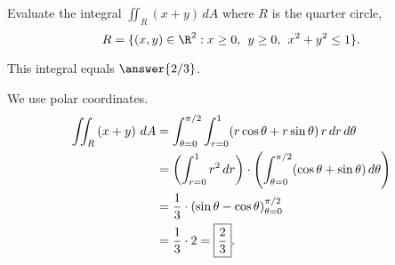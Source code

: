 \documentclass{ximera}
\author{Jim Fowler}
\begin{document}
\begin{exercise}
  Evaluate the integral $\displaystyle\iint_R \left(x + y\right) \, dA$ where $R$ is the quarter circle,
$$
R = \{ (x,y) \in \R^2 : x \geq 0,\hspace{1ex} y \geq 0,\hspace{1ex} x^2 + y^2 \leq 1 \}.
$$

This integral equals $\answer{2/3}$.

\begin{hint}
 We use polar coordinates.
 \begin{align*}
 \iint_R \left(x + y\right) \, dA
 &= \int_{\theta=0}^{\pi/2} \int_{r=0}^{1} (r \cos \theta + r \sin \theta) \, r \, dr \, d\theta \\  
 &= \left( \int_{r=0}^{1} r^2 \, dr \right) \cdot \left( \int_{\theta=0}^{\pi/2} (\cos \theta + \sin \theta) \, d\theta \right) \\  
 &= \frac{1}{3}  \cdot \left(\sin \theta - \cos \theta\right)_{\theta=0}^{\pi/2} \\
 &= \frac{1}{3}  \cdot 2 = \fbox{$\displaystyle\frac{2}{3}$}.
 \end{align*}
\end{hint}

\end{exercise}
\end{document}
